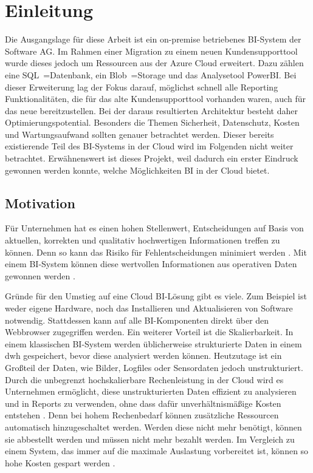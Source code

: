 \chapter{Einleitung} \label{ch:intro}
Die Ausgangslage für diese Arbeit ist ein on-premise betriebenes BI-System der Software AG. Im Rahmen einer Migration zu einem neuen Kundensupporttool wurde dieses jedoch um Ressourcen aus der Azure Cloud erweitert. Dazu zählen eine SQL~=Datenbank, ein Blob~=Storage und das Analysetool PowerBI. Bei dieser Erweiterung lag der Fokus darauf, möglichst schnell alle Reporting Funktionalitäten, die für das alte Kundensupporttool vorhanden waren, auch für das neue bereitzustellen. Bei der daraus resultierten Architektur besteht daher Optimierungspotential. Besonders die Themen Sicherheit, Datenschutz, Kosten und Wartungsaufwand sollten genauer betrachtet werden. Dieser bereits existierende Teil des BI-Systems in der Cloud wird im Folgenden nicht weiter betrachtet. Erwähnenswert ist dieses Projekt, weil dadurch ein erster Eindruck gewonnen werden konnte, welche Möglichkeiten BI in der Cloud bietet.

\section{Motivation} \label{sec:intro:motivation}
Für Unternehmen hat es einen hohen Stellenwert, Entscheidungen auf Basis von aktuellen, korrekten und qualitativ hochwertigen Informationen treffen zu können. Denn so kann das Risiko für Fehlentscheidungen minimiert werden \cite{grunwald_business_2009}. Mit einem BI-System können diese wertvollen Informationen aus operativen Daten gewonnen werden \cite{muller_business_2013}.

Gründe für den Umstieg auf eine Cloud BI-Lösung gibt es viele. Zum Beispiel ist weder eigene Hardware, noch das Installieren und Aktualisieren von Software notwendig. Stattdessen kann auf alle BI-Komponenten direkt über den Webbrowser zugegriffen werden. Ein weiterer Vorteil ist die Skalierbarkeit. In einem klassischen BI-System werden üblicherweise strukturierte Daten in einem \ac{dwh} gespeichert, bevor diese analysiert werden können. Heutzutage ist ein Großteil der Daten, wie Bilder, Logfiles oder Sensordaten jedoch unstrukturiert. Durch die unbegrenzt hochskalierbare Rechenleistung in der Cloud wird es Unternehmen ermöglicht, diese unstrukturierten Daten effizient zu analysieren und in Reports zu verwenden, ohne dass dafür unverhältnismäßige Kosten entstehen \cite{gurjar_cloud_2013}. Denn bei hohem Rechenbedarf können zusätzliche Ressourcen automatisch hinzugeschaltet werden. Werden diese nicht mehr benötigt, können sie abbestellt werden und müssen nicht mehr bezahlt werden. Im Vergleich zu einem System, das immer auf die maximale Auslastung vorbereitet ist, können so hohe Kosten gespart werden \cite{ouf_cloud_2011}.

